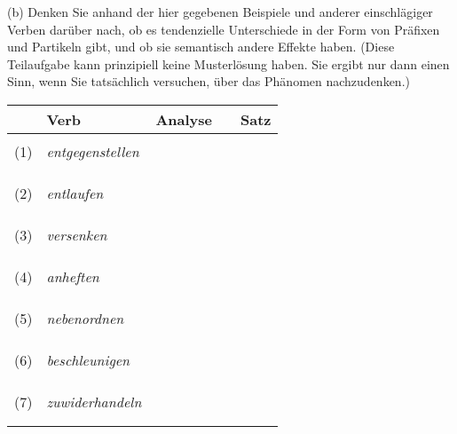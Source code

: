 (b) Denken Sie anhand der hier gegebenen Beispiele und anderer einschlägiger Verben darüber nach, ob es tendenzielle Unterschiede in der Form von Präfixen und Partikeln gibt, und ob sie semantisch andere Effekte haben.
(Diese Teilaufgabe kann prinzipiell keine Musterlösung haben.
Sie ergibt nur dann einen Sinn, wenn Sie tatsächlich versuchen, über das Phänomen nachzudenken.)

\begin{center}
  \begin{tabular}[h]{clp{}p{}p{}}
    \toprule
    & Verb & Analyse && Satz \\
    \midrule
    &&&& \\
    (1) & \textit{entgegenstellen} &&& \\\cline{3-3}\cline{5-5}
        &&&& \\
        &&&& \\\cline{5-5}
    &&&& \\
    (2) & \textit{entlaufen} &&& \\\cline{3-3}\cline{5-5}
        &&&& \\
        &&&& \\\cline{5-5}
    &&&& \\
    (3) & \textit{versenken} &&& \\\cline{3-3}\cline{5-5}
        &&&& \\
        &&&& \\\cline{5-5}
    &&&& \\
    (4) & \textit{anheften} &&& \\\cline{3-3}\cline{5-5}
        &&&& \\
        &&&& \\\cline{5-5}
    &&&& \\
    (5) & \textit{nebenordnen} &&& \\\cline{3-3}\cline{5-5}
        &&&& \\
        &&&& \\\cline{5-5}
    &&&& \\
    (6) & \textit{beschleunigen} &&& \\\cline{3-3}\cline{5-5}
        &&&& \\
        &&&& \\\cline{5-5}
    &&&& \\
    (7) & \textit{zuwiderhandeln} &&& \\\cline{3-3}\cline{5-5}
        &&&& \\
        &&&& \\\cline{5-5}
  \end{tabular}
\end{center}

